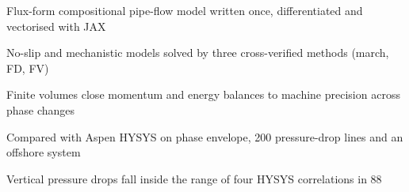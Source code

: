 \documentclass[a4paper,fleqn]{cas-sc}
\begin{document}
\begin{abstract}
Steady-state compositional simulation of gas--liquid flow in wells, flowlines and risers couples a cubic equation of state and an isothermal flash to mixture momentum and energy balances closed by homogeneous or flow-pattern-dependent mechanistic relations. This article, the first of two, presents a simulator in which the physics is written once, in flux form, and executed on an array backend with automatic differentiation (JAX): the Jacobian of the conserved fluxes, the derivatives of the flash with respect to pressure and temperature and the sparse Newton Jacobians are exact, and the compiled program is vectorised over cases. A no-slip and a mechanistic model are solved by an adaptive Runge--Kutta march and by finite-difference and finite-volume nodal systems; the three methods agree to 0.01 bar and 0.1 K, the finite volumes close the momentum and energy balances to machine precision, and Newton converges in one to three iterations across phase and flow-pattern changes. The thermodynamic kernel reproduces an independent open-source Peng--Robinson implementation to a relative 1e-6. Compared with Aspen HYSYS, the phase envelope of an 11-component fluid agrees to 0.7 bar in the median; in 100 vertical lines the mechanistic model falls inside the range of four HYSYS correlations in 88 %
\end{abstract}

\begin{highlights}
\item Flux-form compositional pipe-flow model written once, differentiated and vectorised with JAX
\item No-slip and mechanistic models solved by three cross-verified methods (march, FD, FV)
\item Finite volumes close momentum and energy balances to machine precision across phase changes
\item Compared with Aspen HYSYS on phase envelope, 200 pressure-drop lines and an offshore system
\item Vertical pressure drops fall inside the range of four HYSYS correlations in 88 %
\end{highlights}
\end{document}
